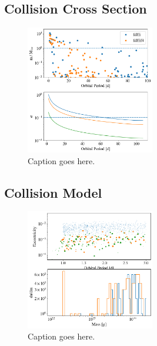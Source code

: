 \documentclass[twocolumn]{aastex63}
\begin{document}
\subsection{Collision Cross Section}

\begin{figure}
\begin{center}
    \includegraphics[width=0.5\textwidth]{figures/f6f4.png}
    \caption{Caption goes here.\label{fig:f6f4}}
\end{center}
\end{figure}


\subsection{Collision Model}

\begin{figure}
\begin{center}
    \includegraphics[width=0.5\textwidth]{figures/frag_ecc.png}
    \caption{Caption goes here.\label{fig:frag_ecc}}
\end{center}
\end{figure}
\end{document}
